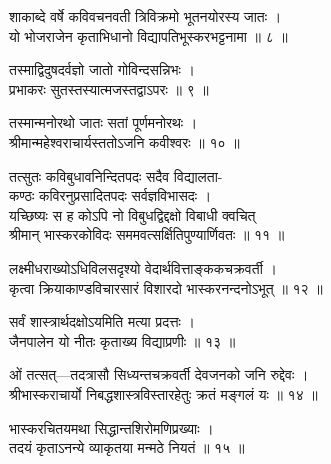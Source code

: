 \documentclass[11pt,a4paper]{book}
\newenvironment{sanskritverse}{
  \begin{center}
  \begin{minipage}{0.92\textwidth}
  \devanagarifont
  \centering
}{
  \end{minipage}
  \end{center}
  \vspace{0.5em}
}
\begin{document}
\begin{sanskritverse}
शाकाब्दे वर्षे कविवचनवती त्रिविक्रमो भूतनयोरस्य जातः ।\\
यो भोजराजेन कृताभिधानो विद्यापतिभूस्करभट्टनामा ॥ ८ ॥
\end{sanskritverse}

\begin{sanskritverse}
तस्माद्विदुषदर्वज्ञो जातो गोविन्दसन्निभः ।\\
प्रभाकरः सुतस्तस्यात्मजस्तद्वाऽपरः ॥ ९ ॥
\end{sanskritverse}

\begin{sanskritverse}
तस्मान्मनोरथो जातः सतां पूर्णमनोरथः ।\\
श्रीमान्महेश्वराचार्यस्ततोऽजनि कवीश्वरः ॥ १० ॥
\end{sanskritverse}

\begin{sanskritverse}
तत्सुतः कविबुधावनिन्दितपदः सदैव विद्यालता-\\
कण्ठः कविरनुप्रसादितपदः सर्वज्ञविभासदः ।\\
यच्छिष्यः स ह कोऽपि नो विबुधद्विद्दक्षो विबाधी क्वचित्\\
श्रीमान् भास्करकोविदः सममवत्सर्क्षितिपुण्यार्णिवतः ॥ ११ ॥
\end{sanskritverse}

\begin{sanskritverse}
लक्ष्मीधराख्योऽधिविलसदृश्यो वेदार्थवित्ताङ्ककचक्रवर्ती ।\\
कृत्वा क्रियाकाण्डविचारसारं विशारदो भास्करनन्दनोऽभूत् ॥ १२ ॥
\end{sanskritverse}

\begin{sanskritverse}
सर्वं शास्त्रार्थदक्षोऽयमिति मत्या प्रदत्तः ।\\
जैनपालेन यो नीतः कृताख्य विद्याप्रणीः ॥ १३ ॥
\end{sanskritverse}

\begin{sanskritverse}
ओं तत्सत्—तदत्रासौ सिध्यन्तचक्रवर्ती देवजनको जनि रुद्देवः ।\\
श्रीभास्कराचार्यो निबद्धशास्त्रविस्तारहेतुः क्रतं मङ्गलं यः ॥ १४ ॥
\end{sanskritverse}

\begin{sanskritverse}
भास्करचितयमथा सिद्धान्तशिरोमणिप्रख्याः ।\\
तदयं कृताऽनन्ये व्याकृतया मन्मठे नियतं ॥ १५ ॥
\end{sanskritverse}
\end{document}

